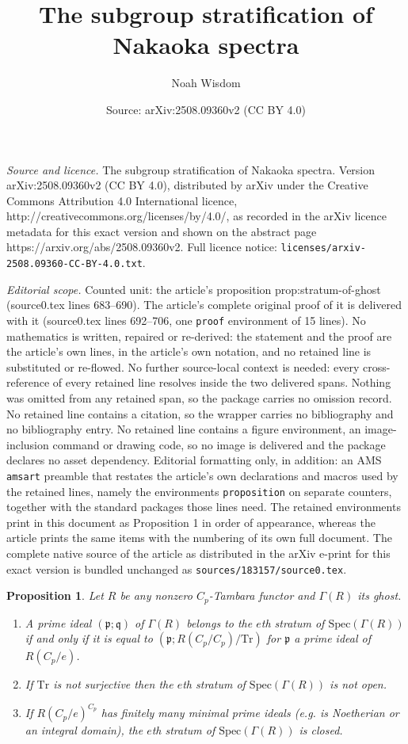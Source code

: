 \documentclass[10pt,a4paper]{amsart}
\title{The subgroup stratification of Nakaoka spectra}
\author{Noah Wisdom}
\date{Source: arXiv:2508.09360v2 (CC BY 4.0)}
\newtheorem{proposition}{Proposition}
\newcommand{\Spec}{\mathrm{Spec}}
\newcommand{\Tr}{\mathrm{Tr}}
\newcommand{\ghost}{\Gamma}
\newcommand{\p}{\mathfrak{p}}
\newcommand{\q}{\mathfrak{q}}
\begin{document}
\maketitle

\noindent\emph{Source and licence.} The subgroup stratification of Nakaoka spectra. Version arXiv:2508.09360v2 (CC BY 4.0), distributed by arXiv under the Creative Commons Attribution 4.0 International licence, http://creativecommons.org/licenses/by/4.0/, as recorded in the arXiv licence metadata for this exact version and shown on the abstract page https://arxiv.org/abs/2508.09360v2. Full licence notice: \texttt{licenses/arxiv-2508.09360-CC-BY-4.0.txt}.\par\smallskip

\noindent\textit{Editorial scope.} Counted unit: the article's proposition prop:stratum-of-ghost (source0.tex lines 683--690). The article's complete original proof of it is delivered with it (source0.tex lines 692--706, one \texttt{proof} environment of 15 lines). No mathematics is written, repaired or re-derived: the statement and the proof are the article's own lines, in the article's own notation, and no retained line is substituted or re-flowed.  No further source-local context is needed: every cross-reference of every retained line resolves inside the two delivered spans.  Nothing was omitted from any retained span, so the package carries no omission record.  No retained line contains a citation, so the wrapper carries no bibliography and no bibliography entry.  No retained line contains a figure environment, an image-inclusion command or drawing code, so no image is delivered and the package declares no asset dependency.  Editorial formatting only, in addition: an AMS \texttt{amsart} preamble that restates the article's own declarations and macros used by the retained lines, namely the environments \texttt{proposition} on separate counters, together with the standard packages those lines need.  The retained environments print in this document as Proposition 1 in order of appearance, whereas the article prints the same items with the numbering of its own full document.  The complete native source of the article as distributed in the arXiv e-print for this exact version is bundled unchanged as \texttt{sources/183157/source0.tex}.
\begin{proposition}\label{prop:stratum-of-ghost}
    Let $R$ be any nonzero $C_p$-Tambara functor and $\ghost(R)$ its ghost. 
    \begin{enumerate}
        \item A prime ideal $(\p;\q)$ of $\ghost(R)$ belongs to the $e$th stratum of $\Spec(\ghost(R))$ if and only if it is equal to $(\p;R(C_p/C_p)/\Tr)$ for $\p$ a prime ideal of $R(C_p/e)$.
        \item If $\Tr$ is not surjective then the $e$th stratum of $\Spec(\ghost(R))$ is not open.
        \item If $R(C_p/e)^{C_p}$ has finitely many minimal prime ideals (e.g. is Noetherian or an integral domain), the $e$th stratum of $\Spec(\ghost(R))$ is closed.
    \end{enumerate}
\end{proposition}
\end{document}
